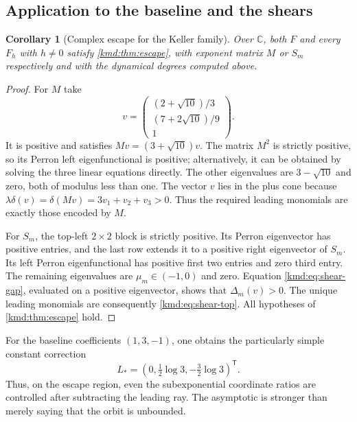 \documentclass[11pt,a4paper]{article}
\numberwithin{equation}{section}
\newtheorem{corollary}[theorem]{Corollary}
\theoremstyle{definition}
\theoremstyle{remark}
\newcommand{\C}{\mathbb C}
\begin{document}
\subsection{Application to the baseline and the shears}
\begin{corollary}[Complex escape for the Keller family]\label{kmd:cor:escape-family}
Over $\C$, both $F$ and every $F_h$ with $h\ne0$ satisfy
\cref{kmd:thm:escape}, with exponent matrix $M$ or $S_m$ respectively
and with the dynamical degrees computed above.
\end{corollary}
\begin{proof}
For $M$ take
\begin{equation}
 v=\begin{pmatrix}
 (2+\sqrt{10})/3\\(7+2\sqrt{10})/9\\1
 \end{pmatrix}.
 \label{kmd:eq:base-eigenvector}
\end{equation}
It is positive and satisfies $Mv=(3+\sqrt{10})v$.
The matrix $M^2$ is strictly positive, so its Perron left
eigenfunctional is positive; alternatively, it can be obtained by
solving the three linear equations directly. The other eigenvalues
are $3-\sqrt{10}$ and zero, both of modulus less than one. The
vector $v$ lies in the plus cone because
$\lambda\delta(v)=\delta(Mv)=3v_1+v_2+v_3>0$.
Thus the required leading monomials are exactly those encoded by
$M$.

For $S_m$, the top-left $2\times2$ block is strictly positive.
Its Perron eigenvector has positive entries, and the last row
extends it to a positive right eigenvector of $S_m$. Its left
Perron eigenfunctional has positive first two entries and zero
third entry. The remaining eigenvalues are $\mu_m\in(-1,0)$
and zero. Equation \eqref{kmd:eq:shear-gap}, evaluated on a positive
eigenvector, shows that $\Delta_m(v)>0$. The unique leading
monomials are consequently \eqref{kmd:eq:shear-top}. All hypotheses
of \cref{kmd:thm:escape} hold.
\end{proof}

For the baseline coefficients $(1,3,-1)$, one obtains the particularly
simple constant correction
\begin{equation}
 L_*=(0,\tfrac12\log3,-\tfrac32\log3)^\mathsf T.
 \label{kmd:eq:base-Lstar}
\end{equation}
Thus, on the escape region, even the subexponential coordinate
ratios are controlled after subtracting the leading ray. The
asymptotic is stronger than merely saying that the orbit is
unbounded.
\end{document}
